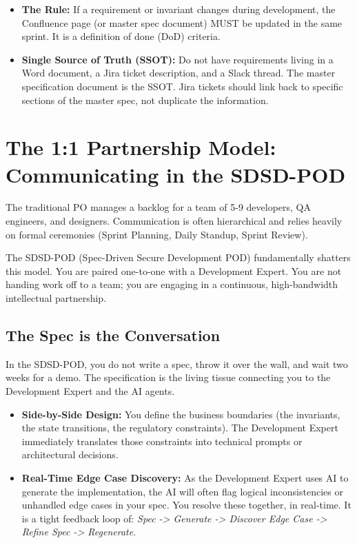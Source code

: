 \begin{itemize}
\tightlist
\item
  \textbf{The Rule:} If a requirement or invariant changes during
  development, the Confluence page (or master spec document) MUST be
  updated in the same sprint. It is a definition of done (DoD) criteria.
\item
  \textbf{Single Source of Truth (SSOT):} Do not have requirements
  living in a Word document, a Jira ticket description, and a Slack
  thread. The master specification document is the SSOT. Jira tickets
  should link back to specific sections of the master spec, not
  duplicate the information.
\end{itemize}

\bigskip

\section{The 1:1 Partnership Model: Communicating in the
SDSD-POD}\label{the-11-partnership-model-communicating-in-the-sdsd-pod}

The traditional PO manages a backlog for a team of 5-9 developers, QA
engineers, and designers. Communication is often hierarchical and relies
heavily on formal ceremonies (Sprint Planning, Daily Standup, Sprint
Review).

The SDSD-POD (Spec-Driven Secure Development POD) fundamentally shatters
this model. You are paired one-to-one with a Development Expert. You are
not handing work off to a team; you are engaging in a continuous,
high-bandwidth intellectual partnership.

\subsection{The Spec is the
Conversation}\label{the-spec-is-the-conversation}

In the SDSD-POD, you do not write a spec, throw it over the wall, and
wait two weeks for a demo. The specification is the living tissue
connecting you to the Development Expert and the AI agents.

\begin{itemize}
\tightlist
\item
  \textbf{Side-by-Side Design:} You define the business boundaries (the
  invariants, the state transitions, the regulatory constraints). The
  Development Expert immediately translates those constraints into
  technical prompts or architectural decisions.
\item
  \textbf{Real-Time Edge Case Discovery:} As the Development Expert uses
  AI to generate the implementation, the AI will often flag logical
  inconsistencies or unhandled edge cases in your spec. You resolve
  these together, in real-time. It is a tight feedback loop of:
  \emph{Spec -\textgreater{} Generate -\textgreater{} Discover Edge Case
  -\textgreater{} Refine Spec -\textgreater{} Regenerate}.
\end{itemize}

